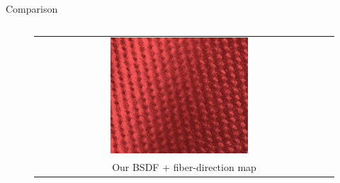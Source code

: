 \documentclass[final]{beamer}
\newlength{\onecolwid}
\newlength{\twocolwid}
\begin{document}
\begin{frame}[t]
\begin{columns}[t]
\begin{column}{\twocolwid}
\begin{block}{Comparison}
\begin{columns}[t,totalwidth=\twocolwid]
\begin{column}{\onecolwid}
\begin{figure}
\begin{tabular}{cc}
                    		\includegraphics[width=0.49\textwidth]{images/results/gabardine_inset_512spp.jpg} \\
                    		\multicolumn{2}{c}{\small{Our BSDF + fiber-direction map}}
                    	\end{tabular}
                    \end{figure} 
                \end{column}
            \end{columns}
        \end{block}
    \end{column}
    

\end{columns}
\end{frame}
\end{document}

